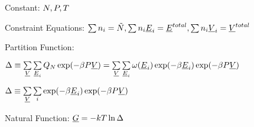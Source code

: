 \begin{bigmdframed}

    
\begin{listone}
    
    \item Constant: $\nummoles, \p, \Temp$

    \item Constraint Equations: $\sum\nolimits n_{i} = \tilde{\nummoles}, \sum\nolimits n_{i}\uline{\energy}_{i} = \uline{\energy}^{total},\sum\nolimits n_{i}\uline{\vol}_{i} = \uline{\vol}^{total}  $     %
    
    \item Partition Function:
    
    \begin{listtwo}
    
    	\item $\iipf \equiv \sum\limits_{\uline{\vol}}\sum\limits_{\uline{\energy}_{i}} \cpf\exp(-\boltznorm\p\uline{\vol}) = \sum\limits_{\uline{\vol}}\sum\limits_{\uline{\energy}_{i}} \mpf(\uline{\energy}_{i})\exp(-\boltznorm\uline{\energy}_{i})\exp(-\boltznorm\p\uline{\vol}) $
    
    	\item $\iipf \equiv \sum\limits_{\uline{\vol}}\sum\limits_{i} \exp(-\boltznorm\uline{\energy}_{i})\exp(-\boltznorm\p\uline{\vol}) $
    
    \end{listtwo}
        
    \item Natural Function: $\uline{\gibbs} = -\thermcond\Temp\ln\iipf$
    
\end{listone}
    
\end{bigmdframed}